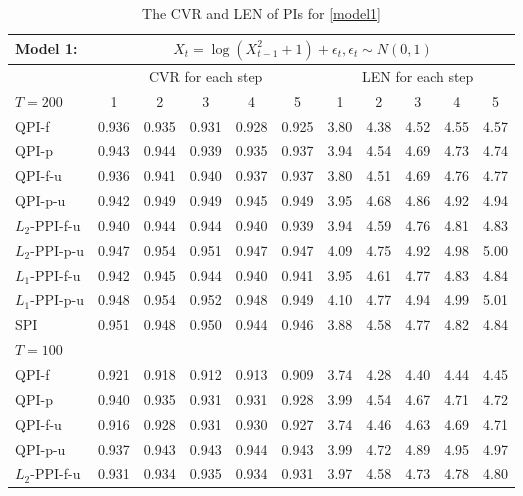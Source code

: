 \documentclass[a4paper]{article}
\begin{document}
\begin{table}[H]
\centering
  \caption{The CVR and LEN of PIs for \cref{model1}}
  \vspace{2pt}
  \label{Tab:model1}
\begin{tabular}{lcccccccccc}
  \toprule 
 Model 1: & \multicolumn{10}{c}{$X_t = \log(X_{t-1}^2 + 1) + \epsilon_t, \epsilon_t\sim N(0,1)$} \\
 \midrule
  & \multicolumn{5}{c}{CVR for each step} & \multicolumn{5}{c}{LEN for each step}\\
    $T = 200$  & 1     & 2     & 3     & 4     & 5 & 1 & 2 & 3 & 4 & 5  \\[3pt]
  QPI-f & 0.936 & 0.935 & 0.931 & 0.928 & 0.925 & 3.80 & 4.38 & 4.52 & 4.55 & 4.57 \\ 
  QPI-p & 0.943 & 0.944 & 0.939 & 0.935 & 0.937 & 3.94 & 4.54 & 4.69 & 4.73 & 4.74  \\ 
  QPI-f-u & 0.936 & 0.941 & 0.940 & 0.937 & 0.937 & 3.80 & 4.51 & 4.69 & 4.76 & 4.77 \\ 
  QPI-p-u & 0.942 & 0.949 & 0.949 & 0.945 & 0.949 & 3.95 & 4.68 & 4.86 & 4.92 & 4.94 \\ 
  $L_2$-PPI-f-u & 0.940 & 0.944 & 0.944 & 0.940 & 0.939 & 3.94 & 4.59 & 4.76 & 4.81 & 4.83 \\ 
  $L_2$-PPI-p-u & 0.947 & 0.954 & 0.951 & 0.947 & 0.947 & 4.09 & 4.75 & 4.92 & 4.98 & 5.00  \\ 
  $L_1$-PPI-f-u & 0.942 & 0.945 & 0.944 & 0.940 & 0.941 & 3.95 & 4.61 & 4.77 & 4.83 & 4.84 \\ 
  $L_1$-PPI-p-u & 0.948 & 0.954 & 0.952 & 0.948 & 0.949 & 4.10 & 4.77 & 4.94 & 4.99 & 5.01  \\ 
  SPI & 0.951 & 0.948 & 0.950 & 0.944 & 0.946 & 3.88 & 4.58 & 4.77 & 4.82 & 4.84 \\[3pt]
    $T = 100$        &       &       &       &       &  \\[3pt]
QPI-f & 0.921 & 0.918 & 0.912 & 0.913 & 0.909 & 3.74 & 4.28 & 4.40 & 4.44 & 4.45 \\
  QPI-p & 0.940 & 0.935 & 0.931 & 0.931 & 0.928 & 3.99 & 4.54 & 4.67 & 4.71 & 4.72 \\ 
  QPI-f-u & 0.916 & 0.928 & 0.931 & 0.930 & 0.927 & 3.74 & 4.46 & 4.63 & 4.69 & 4.71 \\ 
  QPI-p-u & 0.937 & 0.943 & 0.943 & 0.944 & 0.943 & 3.99 & 4.72 & 4.89 & 4.95 & 4.97 \\ 
  $L_2$-PPI-f-u & 0.931 & 0.934 & 0.935 & 0.934 & 0.931 & 3.97 & 4.58 & 4.73 & 4.78 & 4.80 \\ 

\end{tabular}
\end{table}
\end{document}
